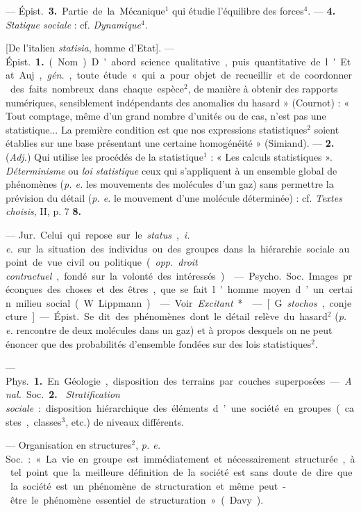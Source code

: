 \begin{itemize}[leftmargin=1cm, label=, itemsep=1pt]
 — \si{Épist.} {\bf 3.} Partie de la Mécanique$^1$ qui
étudie l’équilibre des forces$^4$. — {\bf 4.} {\it Statique sociale} : cf.
{\it Dynamique}$^4$.

 [De l'italien {\it statisia}, homme d'Etat]. — \si{Épist.}
{\bf 1.} (Nom). D'abord science qualitative, puis quantitative de l'Etat.
Auj., {\it gén.}, toute étude « qui a pour objet de recueillir et de
coordonner des faits nombreux dans chaque espèce$^2$, de manière à obtenir
des rapports numériques, sensiblement indépendants des anomalies du hasard
» (Cournot) : « Tout comptage, même d’un grand nombre d'unités ou de cas,
n’est pas une statistique... La première condition est que nos expressions
statistiques$^2$ soient établies sur une base présentant une certaine
homogénéité » (Simiand). — {\bf 2.} ({\it Adj.}) Qui utilise les procédés de
la statistique$^1$ : « Les calculs statistiques ». {\it Déterminisme} ou {\it
loi statistique} ceux qui s'appliquent à un ensemble global de phénomènes
({\it p. e.} les mouvements des molécules d’un gaz) sans permettre la
prévision du détail ({\it p. e.} le mouvement d’une molécule déterminée) :
 cf. {\it Textes choisis}, II, p. 7 {\bf 8.}

 — \si{Jur.} Celui qui repose sur le {\it status},
{\it i. e.} sur la situation des individus ou des groupes dans la hiérarchie
sociale au point de vue civil ou politique ({\it opp.} {\it droit
contractuel}, fondé sur la volonté des intéressés).

 — \si{Psycho.} \si{Soc.} Images préconçues des choses et des
êtres, que se fait l'homme moyen d’un certain milieu social (W. Lippmann).

 — Voir {\it Excitant}*.

 — [G. {\it stochos}, conjecture] — \si{Épist.} Se dit des
phénomènes
dont le détail relève du hasard$^2$ ({\it p. e.} rencontre de deux molécules
dans un gaz) et à propos desquels on ne peut énoncer que des probabilités
d'ensemble fondées sur des lois statistiques$^2$.

 — \si{Phys.} {\bf 1.} En Géologie, disposition des
terrains par couches superposées. — {\it Anal.} \si{Soc.} {\bf 2.} {\it
Stratification sociale} : disposition hiérarchique des éléments d’une société
en groupes (castes, classes$^3$, etc.) de niveaux différents.

 — Organisation en structures$^2$, {\it p. e.} \si{Soc.} :
« La vie en groupe est immédiatement et nécessairement structurée, à tel
point que la meilleure définition de la société est sans doute de dire que la
société est un phénomène de structuration et même peut-être le phénomène
essentiel de structuration » (Davy).


\end{itemize}
